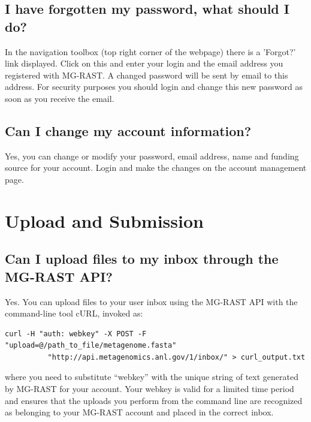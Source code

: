 \documentclass[12pt,fullpage]{report}
\begin{document}
\subsection{I have forgotten my password, what should I do?}
In the navigation toolbox (top right corner of the webpage) there is a 'Forgot?' link displayed. Click on this and enter your login and the email address you registered with MG-RAST. A changed password will be sent by email to this address. For security purposes you should login and change this new password as soon as you receive the email. 
\subsection{Can I change my account information?}
Yes, you can change or modify your password, email address, name and funding source for your account. Login and make the changes on the account management page.
\section{Upload and Submission}
\subsection{Can I upload files to my inbox through the MG-RAST API?}
Yes.  You can upload files to your user inbox using the MG-RAST API with the command-line tool cURL, invoked as:

\begin{small}
\begin{verbatim}
curl -H "auth: webkey" -X POST -F "upload=@/path_to_file/metagenome.fasta"
          "http://api.metagenomics.anl.gov/1/inbox/" > curl_output.txt
\end{verbatim}
\end{small}

\noindent
where you need to substitute ``webkey'' with the unique string of text generated by MG-RAST for your account. Your webkey is valid for a limited time period and ensures that the uploads you perform from the command line are recognized as belonging to your MG-RAST account and placed in the correct inbox.
%
%
\end{document}
